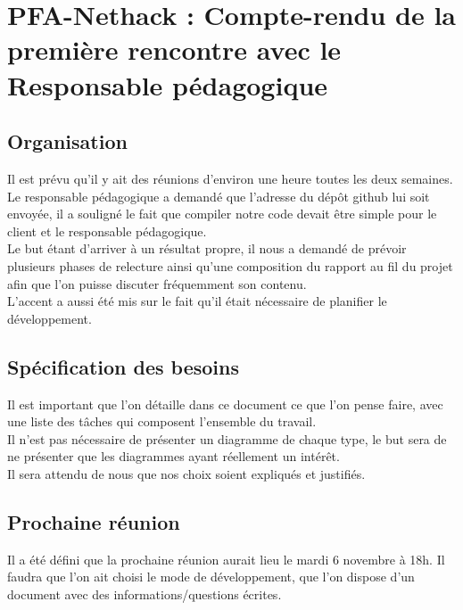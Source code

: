 \documentclass{article}
\begin{document}
\section*{PFA-Nethack : Compte-rendu de la première rencontre avec le Responsable pédagogique}


\subsection*{Organisation}
Il est prévu qu'il y ait des réunions d'environ une heure toutes les deux semaines.\\
Le responsable pédagogique a demandé que l'adresse du dépôt github lui soit envoyée, il a souligné le fait que compiler notre code devait être simple pour le client et le responsable pédagogique.\\
Le but étant d'arriver à un résultat propre, il nous a demandé de prévoir plusieurs phases de relecture ainsi qu'une composition du rapport au fil du projet afin que l'on puisse discuter fréquemment son contenu.\\
L'accent a aussi été mis sur le fait qu'il était nécessaire de planifier le développement.

\subsection*{Spécification des besoins}
Il est important que l'on détaille dans ce document ce que l'on pense faire, avec une liste des tâches qui composent l'ensemble du travail.\\
Il n'est pas nécessaire de présenter un diagramme de chaque type, le but sera de ne présenter que les diagrammes ayant réellement un intérêt.\\
Il sera attendu de nous que nos choix soient expliqués et justifiés.

\subsection*{Prochaine réunion}
Il a été défini que la prochaine réunion aurait lieu le mardi 6 novembre à 18h. Il faudra que l'on ait choisi le mode de développement, que l'on dispose d'un document avec des informations/questions écrites.
\end{document}
